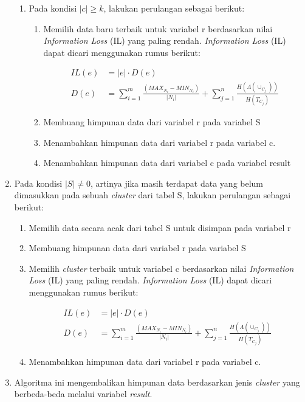 \begin{enumerate}
\begin{enumerate}
\item Pada kondisi $|c| \geq k$, lakukan perulangan sebagai berikut:

\begin{enumerate}
\item Memilih data baru terbaik untuk variabel r berdasarkan nilai \textit{Information Loss} (IL) yang paling rendah. \textit{Information Loss} (IL) dapat dicari menggunakan rumus berikut:

\begin{align*}
IL(e)&= |e| \cdot D(e) \\
D(e) &= \sum_{i=1}^{m} \frac{(MAX_{N_i} - MIN_{N_i})}{|N_i|} + \sum_{j=1}^{n}\frac{H(\Lambda(\cup_{C_j}))}{H(T_{C_j})}
\end{align*}

\item Membuang himpunan data dari variabel r pada variabel S

\item Menambahkan himpunan data dari variabel r pada variabel c.

\item Menambahkan himpunan data dari variabel c pada variabel result

\end{enumerate}

\end{enumerate}

\item Pada kondisi $|S| \neq  0$, artinya jika masih terdapat data yang belum dimasukkan pada sebuah \textit{cluster} dari tabel S, lakukan perulangan sebagai berikut:

\begin{enumerate}
\item Memilih data secara acak dari tabel S untuk disimpan pada variabel r

\item Membuang himpunan data dari variabel r pada variabel S

\item Memilih \textit{cluster} terbaik untuk variabel c berdasarkan nilai \textit{Information Loss} (IL) yang paling rendah. \textit{Information Loss} (IL) dapat dicari menggunakan rumus berikut:

\begin{align*}
IL(e)&= |e| \cdot D(e) \\
D(e) &= \sum_{i=1}^{m} \frac{(MAX_{N_i} - MIN_{N_i})}{|N_i|} + \sum_{j=1}^{n}\frac{H(\Lambda(\cup_{C_j}))}{H(T_{C_j})}
\end{align*}

\item Menambahkan himpunan data dari variabel r pada variabel c.

\end{enumerate}

\item Algoritma ini mengembalikan himpunan data berdasarkan jenis \textit{cluster} yang berbeda-beda melalui variabel \textit{result}.

\end{enumerate}

